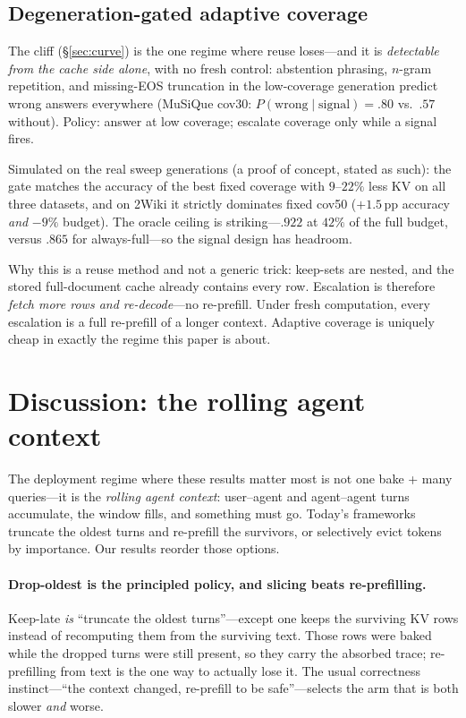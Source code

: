 \documentclass{article} %
\newcommand{\pp}{\,\mathrm{pp}}
\begin{document}
\subsection{Degeneration-gated adaptive coverage}
\label{sec:gate}

The cliff (\S\ref{sec:curve}) is the one regime where reuse loses---and it is \emph{detectable from the cache side alone}, with no fresh control: abstention phrasing, $n$-gram repetition, and missing-EOS truncation in the low-coverage generation predict wrong answers everywhere (MuSiQue cov30: $P(\text{wrong}\mid\text{signal})=.80$ vs.\ $.57$ without). Policy: answer at low coverage; escalate coverage only while a signal fires.

Simulated on the real sweep generations (a proof of concept, stated as such): the gate matches the accuracy of the best fixed coverage with $9$--$22\%$ less KV on all three datasets, and on 2Wiki it strictly dominates fixed cov50 ($+1.5\pp$ accuracy \emph{and} $-9\%$ budget). The oracle ceiling is striking---$.922$ at $42\%$ of the full budget, versus $.865$ for always-full---so the signal design has headroom.

Why this is a reuse method and not a generic trick: keep-sets are nested, and the stored full-document cache already contains every row. Escalation is therefore \emph{fetch more rows and re-decode}---no re-prefill. Under fresh computation, every escalation is a full re-prefill of a longer context. Adaptive coverage is uniquely cheap in exactly the regime this paper is about.

\section{Discussion: the rolling agent context}
\label{sec:outlook}

The deployment regime where these results matter most is not one bake + many queries---it is the \emph{rolling agent context}: user--agent and agent--agent turns accumulate, the window fills, and something must go. Today's frameworks truncate the oldest turns and re-prefill the survivors, or selectively evict tokens by importance. Our results reorder those options.

\paragraph{Drop-oldest is the principled policy, and slicing beats re-prefilling.}
Keep-late \emph{is} ``truncate the oldest turns''---except one keeps the surviving KV rows instead of recomputing them from the surviving text. Those rows were baked while the dropped turns were still present, so they carry the absorbed trace; re-prefilling from text is the one way to actually lose it. The usual correctness instinct---``the context changed, re-prefill to be safe''---selects the arm that is both slower \emph{and} worse.
\end{document}
